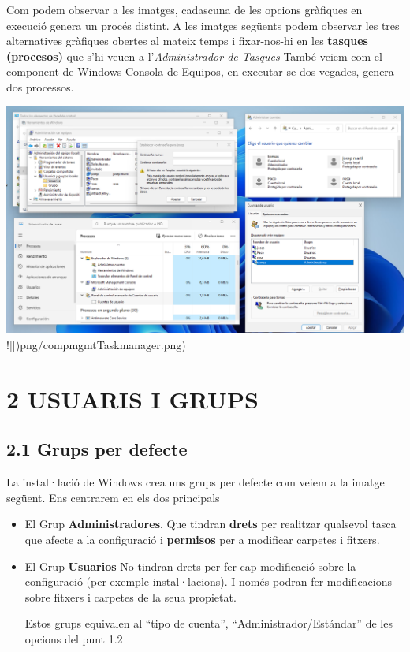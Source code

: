 \documentclass[
  a4paper,
]{article}
\begin{document}
Com podem observar a les imatges, cadascuna de les opcions gràfiques en
execució genera un procés distint. A les imatges següents podem observar
les tres alternatives gràfiques obertes al mateix temps i fixar-nos-hi
en les \textbf{tasques (procesos)} que s'hi veuen a
l'\emph{Administrador de Tasques} També veiem com el component de
Windows Consola de Equipos, en executar-se dos vegades, genera dos
processos.

\includegraphics{png/123.png} !{[}{]})png/compmgmtTaskmanager.png)

\section{2 USUARIS I GRUPS}\label{usuaris-i-grups}

\subsection{2.1 Grups per defecte}\label{grups-per-defecte}

La instal·lació de Windows crea uns grups per defecte com veiem a la
imatge següent. Ens centrarem en els dos principals

\begin{itemize}
\item
  El Grup \textbf{Administradores}. Que tindran \textbf{drets} per
  realitzar qualsevol tasca que afecte a la configuració i
  \textbf{permisos} per a modificar carpetes i fitxers.
\item
  El Grup \textbf{Usuarios} No tindran drets per fer cap modificació
  sobre la configuració (per exemple instal·lacions). I només podran fer
  modificacions sobre fitxers i carpetes de la seua propietat.

  Estos grups equivalen al ``tipo de cuenta'',
  ``Administrador/Estándar'' de les opcions del punt 1.2
\end{itemize}
\end{document}
